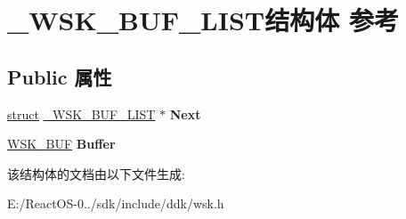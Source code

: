 \hypertarget{struct___w_s_k___b_u_f___l_i_s_t}{}\section{\+\_\+\+W\+S\+K\+\_\+\+B\+U\+F\+\_\+\+L\+I\+S\+T结构体 参考}
\label{struct___w_s_k___b_u_f___l_i_s_t}
\subsection*{Public 属性}
\begin{DoxyCompactItemize}
\item 
\mbox{\label{struct___w_s_k___b_u_f___l_i_s_t_ae91daff71eaa9ce4b227d04d3f845ffb}} 
\hyperlink{interfacestruct}{struct} \hyperlink{struct___w_s_k___b_u_f___l_i_s_t}{\+\_\+\+W\+S\+K\+\_\+\+B\+U\+F\+\_\+\+L\+I\+ST} $\ast$ {\bfseries Next}
\item 
\mbox{\label{struct___w_s_k___b_u_f___l_i_s_t_abc9c0237c82d27b450816411a1231a6c}} 
\hyperlink{struct___w_s_k___b_u_f}{W\+S\+K\+\_\+\+B\+UF} {\bfseries Buffer}
\end{DoxyCompactItemize}


该结构体的文档由以下文件生成\+:\begin{DoxyCompactItemize}
\item 
E\+:/\+React\+O\+S-\/0../sdk/include/ddk/wsk.\+h\end{DoxyCompactItemize}
